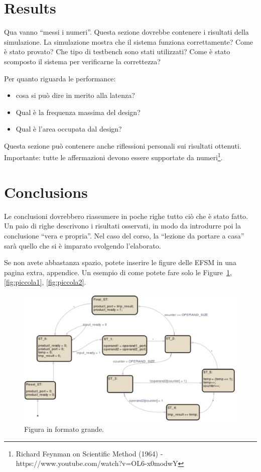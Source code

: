 \documentclass[]{IEEEtran}
\begin{document}
\section{Results}

Qua vanno ``messi i numeri''. Questa sezione dovrebbe contenere i risultati della simulazione. La simulazione mostra che il sistema funziona correttamente? Come \`e stato provato? Che tipo di testbench sono stati utilizzati? Come \`e stato scomposto il sistema per verificarne la correttezza?

Per quanto riguarda le performance:
\begin{itemize}
\item cosa si pu\`o dire in merito alla latenza?
\item Qual è la frequenza massima del design? 
\item Qual è l'area occupata dal design? 
\end{itemize}

Questa sezione pu\`o contenere anche riflessioni personali sui risultati ottenuti. Importante: tutte le affermazioni devono essere supportate da numeri\footnote{Richard Feynman on Scientific Method (1964) -\\ https://www.youtube.com/watch?v=OL6-x0modwY}.

\section{Conclusions}
Le conclusioni dovrebbero riassumere in poche righe  tutto ci\`o che \`e stato fatto. Un paio di righe descrivono i risultati osservati, in modo da introdurre poi la conclusione ``vera e propria''. Nel caso del corso, la ``lezione da portare a casa'' sar\`a quello che si \`e imparato svolgendo l'elaborato.





\appendix
Se non avete abbastanza spazio, potete inserire le figure delle EFSM in una  pagina extra, appendice. Un esempio di come potete fare solo le Figure~\ref{fig:grande}, \ref{fig:piccola1}, \ref{fig:piccola2}.


\begin{figure}[bt]
\centering
\includegraphics[width=\textwidth]{figures/EFSM}
\caption{Figura in formato grande.}
\label{fig:grande}
\end{figure}
\end{document}
